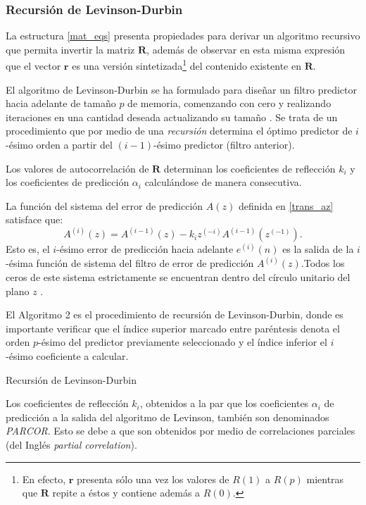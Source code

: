 \subsubsection{Recursión de Levinson-Durbin}
La estructura \eqref{mat_eqs} presenta propiedades para derivar un algoritmo recursivo que permita invertir la matriz $\mathbf{R}$, además de observar en esta misma expresión que el vector $\mathbf{r}$ es una versión sintetizada\footnote{En efecto, $\mathbf{r}$ presenta sólo una vez los valores de $R(1)$ a $R(p)$ mientras que $\mathbf{R}$ repite a éstos y contiene además a $R(0)$.} del contenido existente en $\mathbf{R}$.

El algoritmo de Levinson-Durbin se ha formulado para diseñar un filtro predictor hacia adelante de tamaño $p$ de memoria, comenzando con cero y realizando iteraciones en una cantidad deseada actualizando su tamaño \cite[]{Rabiner1978,Hayes96,Vaidyanathan2008}.  Se trata de un procedimiento que por medio de una \emph{recursión} determina el óptimo predictor de $i$-ésimo orden a partir del $(i-1)$-ésimo predictor (filtro anterior).

Los valores de autocorrelación de $\mathbf{R}$ determinan los coeficientes de reflección $k_i$ y los coeficientes de predicción $\alpha_i$ calculándose de manera consecutiva.

 La función del sistema del error de predicción $A(z)$ definida en \eqref{trans_az} satisface que:
$$A^{(i)}(z)=A^{(i-1)}(z)-k_iz^{(-i)}A^{(i-1)}(z^{(-1)}).$$
Esto es, el $i$-ésimo error de predicción hacia adelante  $e^{(i)}(n)$ es la salida de la $i$-ésima función de sistema del filtro de error de predicción $A^{(i)}(z)$.Todos los ceros de este sistema estrictamente se encuentran dentro del círculo unitario del plano $z$ \cite[]{Makhoul1975}. 

El Algoritmo 2 es el procedimiento de recursión de Levinson-Durbin, donde es importante verificar que el índice superior marcado entre paréntesis denota el orden $p$-ésimo del predictor previamente seleccionado y el índice inferior el $i$-ésimo coeficiente a calcular.
\begin{algorithm}
\begin{algorithmic}
		\ENDFOR
	\ENDIF
\ENDFOR
{}
\end{algorithmic}
\caption{Recursión de Levinson-Durbin}
\label{levinson}
\end{algorithm}
Los coeficientes de reflección $k_i$, obtenidos a la par que los coeficientes $\alpha_{i}$ de predicción a la salida del algoritmo de Levinson, también son denominados \emph{PARCOR}. Esto se debe a que son obtenidos por medio de correlaciones parciales (del Inglés \emph{partial correlation}). 

